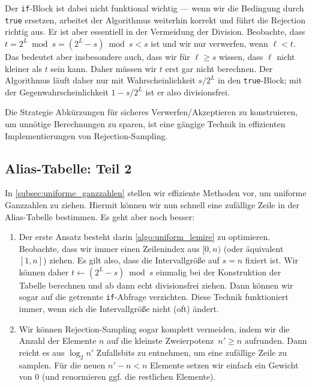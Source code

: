 Der \texttt{if}-Block ist dabei nicht funktional wichtig --- wenn wir die Bedingung durch \texttt{true} ersetzen, arbeitet der Algorithmus weiterhin korrekt und führt die Rejection richtig aus.
Er ist aber essentiell in der Vermeidung der Division.
Beobachte, dass $t = 2^L \bmod s = (2^L - s) \bmod s < s$ ist und wir nur verwerfen, wenn $\ell < t$.
Das bedeutet aber insbesondere auch, dass wir für $\ell \ge s$ wissen, dass $\ell$ nicht kleiner als $t$ sein kann.
Daher müssen wir $t$ erst gar nicht berechnen.
Der Algorithmus läuft daher nur mit Wahrscheinlichkeit $s / 2^L$ in den \texttt{true}-Block; mit der Gegenwahrscheinlichkeit $1 - s/2^L$ ist er also divisionsfrei.

Die Strategie Abkürzungen für sicheres Verwerfen/Akzeptieren zu konstruieren, um unnötige Berechnungen zu sparen, ist eine gängige Technik in effizienten Implementierungen von Rejection-Sampling.

\subsection{Alias-Tabelle: Teil 2}
In \cref{subsec:uniforme_ganzzahlen} stellen wir effiziente Methoden vor, um uniforme Ganzzahlen zu ziehen.
Hiermit können wir nun schnell eine zufällige Zeile in der Alias-Tabelle bestimmen.
Es geht aber noch besser:

\begin{enumerate}
    \item
          Der erste Ansatz besteht darin \cref{algo:uniform_lemire} zu optimieren.
          Beobachte, dass wir immer einen Zeilenindex aus $[0, n)$ (oder äquivalent $[1, n]$) ziehen.
          Es gilt also, dass die Intervallgröße auf $s = n$ fixiert ist.
          Wir können daher $t \gets (2^L -s) \bmod s$ einmalig bei der Konstruktion der Tabelle berechnen und ab dann echt divisionsfrei ziehen.
          Dann können wir sogar auf die getrennte \texttt{if}-Abfrage verzichten.
          Diese Technik funktioniert immer, wenn sich die Intervallgröße nicht (oft) ändert.

    \item
          Wir können Rejection-Sampling sogar komplett vermeiden, indem wir die Anzahl der Elemente $n$ auf die kleinste Zweierpotenz~$n' \ge n$ aufrunden.
          Dann reicht es aus $\log_2 n'$ Zufallsbits zu entnehmen, um eine zufällige Zeile zu samplen.
          Für die neuen $n' -n < n$ Elemente setzen wir einfach ein Gewicht von $0$ (und renormieren ggf. die restlichen Elemente).
\end{enumerate}

